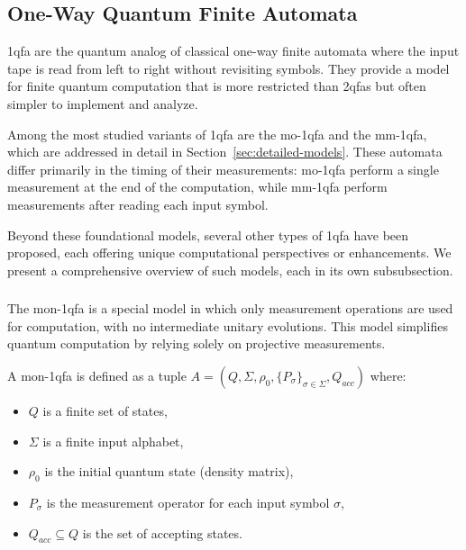\subsection{One-Way Quantum Finite Automata}
\label{sec:1-way-qfa}

\gls{1qfa} are the quantum analog of classical one-way finite automata where the input tape is read from left to right without revisiting symbols. They provide a model for finite quantum computation that is more restricted than \glspl{2qfa} but often simpler to implement and analyze.

Among the most studied variants of \gls{1qfa} are the \gls{mo-1qfa} and the \gls{mm-1qfa}, which are addressed in detail in Section~\ref{sec:detailed-models}. These automata differ primarily in the timing of their measurements: \gls{mo-1qfa} perform a single measurement at the end of the computation, while \gls{mm-1qfa} perform measurements after reading each input symbol.

Beyond these foundational models, several other types of \gls{1qfa} have been proposed, each offering unique computational perspectives or enhancements. We present a comprehensive overview of such models, each in its own subsubsection.

\subsubsection{}
The \gls{mon-1qfa} is a special model in which only measurement operations are used for computation, with no intermediate unitary evolutions. This model simplifies quantum computation by relying solely on projective measurements.

\begin{definition}
A \gls{mon-1qfa} is defined as a tuple \( A = (Q, \Sigma, \rho_0, \{P_{\sigma}\}_{\sigma \in \Sigma}, Q_{acc}) \) where:
\begin{itemize}
    \item \( Q \) is a finite set of states,
    \item \( \Sigma \) is a finite input alphabet,
    \item \( \rho_0 \) is the initial quantum state (density matrix),
    \item \( P_{\sigma} \) is the measurement operator for each input symbol \( \sigma \),
    \item \( Q_{acc} \subseteq Q \) is the set of accepting states.
\end{itemize}
\end{definition}

